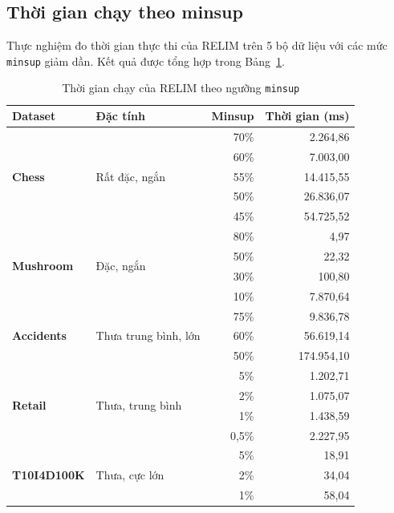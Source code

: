\documentclass[12pt,a4paper]{report}
\begin{document}
\subsection{Thời gian chạy theo minsup}

Thực nghiệm đo thời gian thực thi của RELIM trên 5 bộ dữ liệu với các mức
\texttt{minsup} giảm dần. Kết quả được tổng hợp trong Bảng~\ref{tab:runtime}.

\begin{table}[H]
    \centering
    \caption{Thời gian chạy của RELIM theo ngưỡng \texttt{minsup}}
    \label{tab:runtime}
    \begin{tabular}{|l|l|r|r|}
    \hline
    \textbf{Dataset} & \textbf{Đặc tính} & \textbf{Minsup} & \textbf{Thời gian (ms)} \\
    \hline
    \multirow{5}{*}{\textbf{Chess}}
        & \multirow{5}{*}{Rất đặc, ngắn}
        & 70\% & 2.264{,}86 \\
        \cline{3-4}
        & & 60\% & 7.003{,}00 \\
        \cline{3-4}
        & & 55\% & 14.415{,}55 \\
        \cline{3-4}
        & & 50\% & 26.836{,}07 \\
        \cline{3-4}
        & & 45\% & 54.725{,}52 \\
    \hline
    \multirow{4}{*}{\textbf{Mushroom}}
        & \multirow{4}{*}{Đặc, ngắn}
        & 80\% & 4{,}97 \\
        \cline{3-4}
        & & 50\% & 22{,}32 \\
        \cline{3-4}
        & & 30\% & 100{,}80 \\
        \cline{3-4}
        & & 10\% & 7.870{,}64 \\
    \hline
    \multirow{3}{*}{\textbf{Accidents}}
        & \multirow{3}{*}{Thưa trung bình, lớn}
        & 75\% & 9.836{,}78 \\
        \cline{3-4}
        & & 60\% & 56.619{,}14 \\
        \cline{3-4}
        & & 50\% & 174.954{,}10 \\
    \hline
    \multirow{4}{*}{\textbf{Retail}}
        & \multirow{4}{*}{Thưa, trung bình}
        & 5\%  & 1.202{,}71 \\
        \cline{3-4}
        & & 2\%  & 1.075{,}07 \\
        \cline{3-4}
        & & 1\%  & 1.438{,}59 \\
        \cline{3-4}
        & & 0{,}5\% & 2.227{,}95 \\
    \hline
    \multirow{3}{*}{\textbf{T10I4D100K}}
        & \multirow{3}{*}{Thưa, cực lớn}
        & 5\%  & 18{,}91 \\
        \cline{3-4}
        & & 2\%  & 34{,}04 \\
        \cline{3-4}
        & & 1\%  & 58{,}04 \\
    \hline
    \end{tabular}
\end{table}
\end{document}
